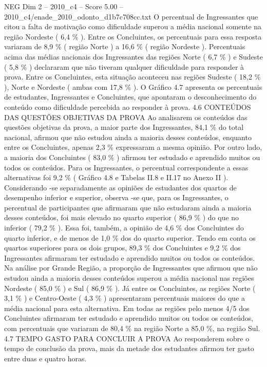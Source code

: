 \begin{textsample}{NEG Dim 2 – 2010\_c4 – Score 5.00 – 2010\_c4/enade\_2010\_odonto\_d1b7c708cc.txt}
O percentual de Ingressantes que citou a falta de motivação como dificuldade superou a média nacional somente na região Nordeste ( 6,4 \% ).
Entre os Concluintes, os percentuais para essa resposta variaram de 8,9 \% ( região Norte ) a 16,6 \% ( região Nordeste ).
Percentuais acima das médias nacionais dos Ingressantes das regiões Norte ( 6,7 \% ) e Sudeste ( 5,8 \% ) declararam que não tiveram qualquer dificuldade para responder à prova.
Entre os Concluintes, esta situação aconteceu nas regiões Sudeste ( 18,2 \% ), Norte e Nordeste ( ambas com 17,8 \% ).
O Gráfico 4.7 apresenta os percentuais de estudantes, Ingressantes e Concluintes, que apontaram o desconhecimento do conteúdo como dificuldade percebida ao responder à prova. 4.6 CONTEÚDOS DAS QUESTÕES OBJETIVAS DA PROVA Ao analisarem os conteúdos das questões objetivas da prova, a maior parte dos Ingressantes, 84,1 \% do total nacional, afirmou que não estudou ainda a maioria desses conteúdos, enquanto entre os Concluintes, apenas 2,3 \% expressaram a mesma opinião.
Por outro lado, a maioria dos Concluintes ( 83,0 \% ) afirmou ter estudado e aprendido muitos ou todos os conteúdos.
Para os Ingressantes, o percentual correspondente a essas alternativas foi 9,2 \% ( Gráfico 4.8 e Tabelas II.8 e II.17 no Anexo II ).
Considerando -se separadamente as opiniões de estudantes dos quartos de desempenho inferior e superior, observa -se que, para os Ingressantes, o percentual de participantes que afirmaram que não estudaram ainda a maioria desses conteúdos, foi mais elevado no quarto superior ( 86,9 \% ) do que no inferior ( 79,2 \% ).
Essa foi, também, a opinião de 4,6 \% dos Concluintes do quarto inferior, e de menos de 1,0 \% dos do quarto superior.
Tendo em conta os quartos superiores para os dois grupos, 89,3 \% dos Concluintes e 9,2 \% dos Ingressantes afirmaram ter estudado e aprendido muitos ou todos os conteúdos.
Na análise por Grande Região, a proporção de Ingressantes que afirmou que não estudou ainda a maioria desses conteúdos superou a média nacional nas regiões Nordeste ( 85,0 \% ) e Sul ( 86,9 \% ).
Já entre os Concluintes, as regiões Norte ( 3,1 \% ) e Centro-Oeste ( 4,3 \% ) apresentaram percentuais maiores do que a média nacional para esta alternativa.
Em todas as regiões pelo menos 4/5 dos Concluintes afirmaram ter estudado e aprendido muitos ou todos os conteúdos, com percentuais que variaram de 80,4 \% na região Norte a 85,0 \%, na região Sul. 4.7 TEMPO GASTO PARA CONCLUIR A PROVA Ao responderem sobre o tempo de conclusão da prova, mais da metade dos estudantes afirmou ter gasto entre duas e quatro horas.

\end{textsample}
